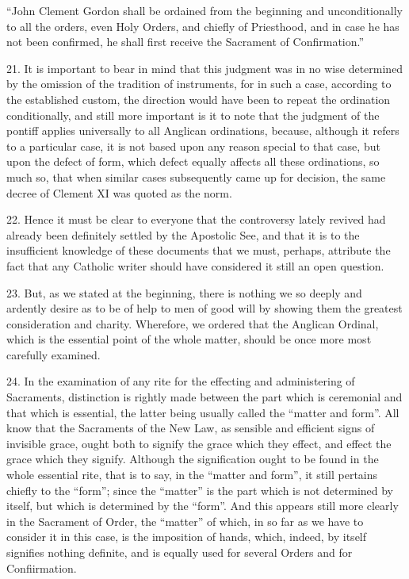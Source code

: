 ``John Clement Gordon shall be ordained from the beginning and
unconditionally to all the orders, even Holy Orders, and chiefly of
Priesthood, and in case he has not been confirmed, he shall first
receive the Sacrament of Confirmation.''

21. It is important to bear in mind that this judgment was in no wise
determined by the omission of the tradition of instruments, for in such
a case, according to the established custom, the direction would have
been to repeat the ordination conditionally, and still more important is
it to note that the judgment of the pontiff applies universally to all
Anglican ordinations, because, although it refers to a particular case,
it is not based upon any reason special to that case, but upon the
defect of form, which defect equally affects all these ordinations, so
much so, that when similar cases subsequently came up for decision, the
same decree of Clement XI was quoted as the norm.

22. Hence it must be clear to everyone that the controversy lately
revived had already been definitely settled by the Apostolic See, and
that it is to the insufficient knowledge of these documents that we
must, perhaps, attribute the fact that any Catholic writer should have
considered it still an open question.

23. But, as we stated at the beginning, there is nothing we so deeply
and ardently desire as to be of help to men of good will by showing them
the greatest consideration and charity. Wherefore, we ordered that the
Anglican Ordinal, which is the essential point of the whole matter,
should be once more most carefully examined.

24. In the examination of any rite for the effecting and administering
of Sacraments, distinction is rightly made between the part which is
ceremonial and that which is essential, the latter being usually called
the ``matter and form''. All know that the Sacraments of the New Law, as
sensible and efficient signs of invisible grace, ought both to signify
the grace which they effect, and effect the grace which they signify.
Although the signification ought to be found in the whole essential
rite, that is to say, in the ``matter and form'', it still pertains
chiefly to the ``form''; since the ``matter'' is the part which is not
determined by itself, but which is determined by the ``form''. And this
appears still more clearly in the Sacrament of Order, the ``matter'' of
which, in so far as we have to consider it in this case, is the
imposition of hands, which, indeed, by itself signifies nothing
definite, and is equally used for several Orders and for Confiirmation.

